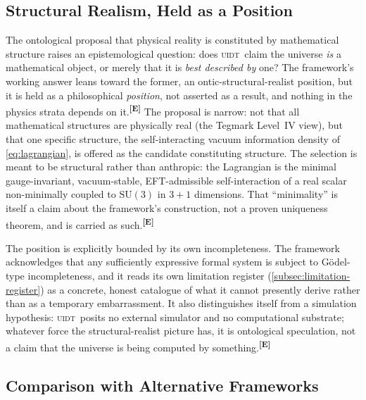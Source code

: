 \documentclass[12pt,a4paper,twoside]{article}
\theoremstyle{plain}
\theoremstyle{definition}
\theoremstyle{remark}
\newcommand{\UIDT}{\textsc{uidt}}
\newcommand{\catmark}[1]{\textsuperscript{\textsf{\textbf{[#1]}}}}
\begin{document}
\subsection{Structural Realism, Held as a Position}
\label{subsec:structural-realism}

The ontological proposal that physical reality is constituted by mathematical structure raises an epistemological question: does \UIDT\ claim the universe \emph{is} a mathematical object, or merely that it is \emph{best described by} one? The framework's working answer leans toward the former, an ontic-structural-realist position, but it is held as a philosophical \emph{position}, not asserted as a result, and nothing in the physics strata depends on it.\catmark{E} The proposal is narrow: not that all mathematical structures are physically real (the Tegmark Level~IV view), but that one specific structure, the self-interacting vacuum information density of \cref{eq:lagrangian}, is offered as the candidate constituting structure. The selection is meant to be structural rather than anthropic: the Lagrangian is the minimal gauge-invariant, vacuum-stable, EFT-admissible self-interaction of a real scalar non-minimally coupled to $\mathrm{SU}(3)$ in $3+1$ dimensions. That ``minimality'' is itself a claim about the framework's construction, not a proven uniqueness theorem, and is carried as such.\catmark{E}

The position is explicitly bounded by its own incompleteness. The framework acknowledges that any sufficiently expressive formal system is subject to Gödel-type incompleteness, and it reads its own limitation register (\cref{subsec:limitation-register}) as a concrete, honest catalogue of what it cannot presently derive rather than as a temporary embarrassment. It also distinguishes itself from a simulation hypothesis: \UIDT\ posits no external simulator and no computational substrate; whatever force the structural-realist picture has, it is ontological speculation, not a claim that the universe is being computed by something.\catmark{E}

\subsection{Comparison with Alternative Frameworks}
\label{subsec:alt-frameworks}
\end{document}
